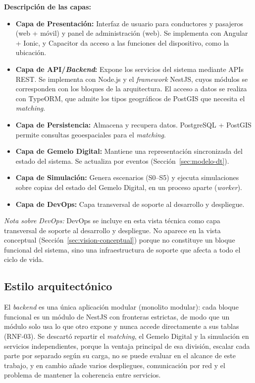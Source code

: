 \textbf{Descripción de las capas:}
\begin{itemize}
    \item \textbf{Capa de Presentación:} Interfaz de usuario para conductores y pasajeros (web + móvil) y panel de administración (web). Se implementa con Angular + Ionic, y Capacitor da acceso a las funciones del dispositivo, como la ubicación.
    \item \textbf{Capa de API/\textit{Backend}:} Expone los servicios del sistema mediante APIs REST. Se implementa con Node.js y el \textit{framework} NestJS, cuyos módulos se corresponden con los bloques de la arquitectura. El acceso a datos se realiza con TypeORM, que admite los tipos geográficos de PostGIS que necesita el \textit{matching}.
    \item \textbf{Capa de Persistencia:} Almacena y recupera datos. PostgreSQL + PostGIS permite consultas geoespaciales para el \textit{matching}.
    \item \textbf{Capa de Gemelo Digital:} Mantiene una representación sincronizada del estado del sistema. Se actualiza por eventos (Sección~\ref{sec:modelo-dt}).
    \item \textbf{Capa de Simulación:} Genera escenarios (S0--S5) y ejecuta simulaciones sobre copias del estado del Gemelo Digital, en un proceso aparte (\textit{worker}).
    \item \textbf{Capa de DevOps:} Capa transversal de soporte al desarrollo y despliegue.
\end{itemize}

\textit{Nota sobre DevOps:} DevOps se incluye en esta vista técnica como capa transversal de soporte al desarrollo y despliegue. No aparece en la vista conceptual (Sección~\ref{sec:vision-conceptual}) porque no constituye un bloque funcional del sistema, sino una infraestructura de soporte que afecta a todo el ciclo de vida.

\subsection{Estilo arquitectónico}
\label{sec:estilo-arquitectonico}

El \textit{backend} es una única aplicación modular (monolito modular): cada bloque funcional es un módulo de NestJS con fronteras estrictas, de modo que un módulo solo usa lo que otro expone y nunca accede directamente a sus tablas (RNF-03). Se descartó repartir el \textit{matching}, el Gemelo Digital y la simulación en servicios independientes, porque la ventaja principal de esa división, escalar cada parte por separado según su carga, no se puede evaluar en el alcance de este trabajo, y en cambio añade varios despliegues, comunicación por red y el problema de mantener la coherencia entre servicios.

